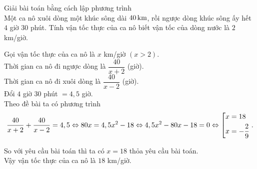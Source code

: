 \begin{ex}%
	Giải bài toán bằng cách lập phương trình\\
 Một ca nô xuôi dòng một khúc sông dài $40 \textrm{\,km}$, rồi ngược dòng khúc sông ấy hết $4$ giờ $30$ phút. Tính vận tốc thực của ca nô biết vận tốc của dòng nước là $2$ km/giờ.
 \loigiai
    {
    Gọi vận tốc thực của ca nô là $x$ km/giờ $(x > 2)$.\\
    Thời gian ca nô đi ngược dòng là $\dfrac{40}{x + 2}$ (giờ).\\
    Thời gian ca nô đi xuôi dòng là $\dfrac{40}{x - 2}$ (giờ).\\
    Đổi $4$ giờ $30$ phút $= 4,5$ giờ.\\
    Theo đề bài ta có phương trình 
    $$\dfrac{40}{x + 2} + \dfrac{40}{x - 2} = 4,5 \Leftrightarrow 80x = 4,5x^2 - 18 \Leftrightarrow 4,5x^2 - 80x - 18 = 0 \Leftrightarrow \left[\begin{aligned}& x = 18\\& x = -\dfrac{2}{9}\end{aligned}\right..$$

    So với yêu cầu bài toán thì ta có $x =18$ thỏa yêu cầu bài toán.\\
    Vậy vận tốc thực của ca nô là $18$ km/giờ.
     
    }
\end{ex}

